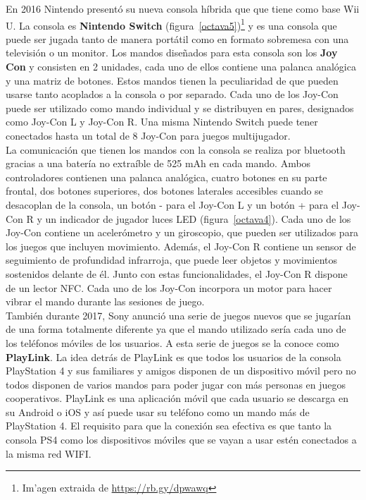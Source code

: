 En 2016 Nintendo present\'o su nueva consola h\'ibrida que que tiene como base Wii U. La consola es \textbf{Nintendo Switch} (figura~\ref{octava5})\footnote{Im'agen extraida de \url{https://rb.gy/dpwawq}} y es una consola que puede ser jugada tanto de manera port\'atil como en formato sobremesa con una televisi\'on o un monitor. Los mandos dise\~nados para esta consola son los \textbf{Joy Con} y consisten en 2 unidades, cada uno de ellos contiene una palanca anal\'ogica y una matriz de botones. Estos mandos tienen la peculiaridad de que pueden usarse tanto acoplados a la consola o por separado. Cada uno de los Joy-Con puede ser utilizado como mando individual y se distribuyen en pares, designados como Joy-Con L y Joy-Con R. Una misma Nintendo Switch puede tener conectados hasta un total de 8 Joy-Con para juegos multijugador.\\

La comunicaci\'on que tienen los mandos con la consola se realiza por bluetooth gracias a una bater\'ia no extra\'ible de 525 mAh en cada mando. Ambos controladores contienen una palanca anal\'ogica, cuatro botones en su parte frontal, dos botones superiores, dos botones laterales accesibles cuando se desacoplan de la consola, un bot\'on - para el Joy-Con L y un bot\'on + para el Joy-Con R y un indicador de jugador luces LED (figura~\ref{octava4}). Cada uno de los Joy-Con contiene un aceler\'ometro y un giroscopio, que pueden ser utilizados para los juegos que incluyen movimiento. Adem\'as, el Joy-Con R contiene un sensor de seguimiento de profundidad infrarroja, que puede leer objetos y movimientos sostenidos delante de \'el. Junto con estas funcionalidades, el Joy-Con R dispone de un lector NFC. Cada uno de los Joy-Con incorpora un motor para hacer vibrar el mando durante las sesiones de juego.\\

Tambi\'en durante 2017, Sony anunci\'o una serie de juegos nuevos que se jugar\'ian de una forma totalmente diferente ya que el mando utilizado ser\'ia cada uno de los tel\'efonos m\'oviles de los usuarios. A esta serie de juegos se la conoce como \textbf{PlayLink}. La idea detr\'as de PlayLink es que todos los usuarios de la consola PlayStation 4 y sus familiares y amigos disponen de un dispositivo m\'ovil pero no todos disponen de varios mandos para poder jugar con m\'as personas en juegos cooperativos. PlayLink es una aplicaci\'on m\'ovil que cada usuario se descarga en su Android o iOS y as\'i puede usar su tel\'efono como un mando m\'as de PlayStation 4. El requisito para que la conexi\'on sea efectiva es que tanto la consola PS4 como los dispositivos m\'oviles que se vayan a usar est\'en conectados a la misma red WIFI.\\

